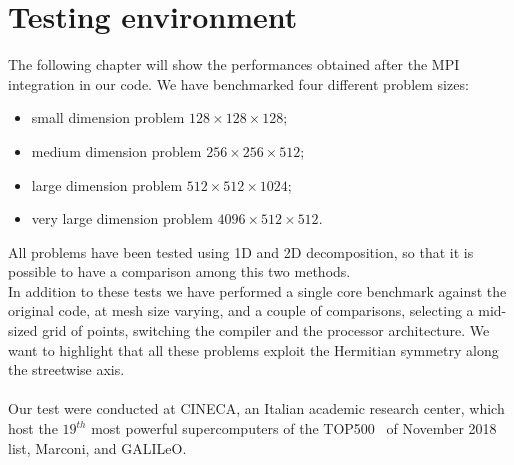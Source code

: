 \section{Testing environment}
The following chapter will show the performances obtained after the MPI integration in our code.
We have benchmarked four different problem sizes:
\begin{itemize}
\item small dimension problem $128\times 128 \times 128$;
\item medium dimension problem $256\times 256\times 512$;
\item large dimension problem $512\times 512\times 1024$;
\item very large dimension problem $4096\times 512\times 512$.  
\end{itemize}
All problems have been tested using 1D and 2D decomposition, so that it is possible to have a comparison among this two methods.
\\
In addition to these tests we have performed a single core benchmark against the original code, at mesh size varying, and a couple of comparisons, selecting a mid-sized grid of points, switching the compiler and the processor architecture.
We want to highlight that all these problems exploit the Hermitian symmetry along the streetwise axis.\\~\\
Our test were conducted at CINECA\cite{Cineca}, an Italian academic research center, which host the $19^{th}$ most powerful supercomputers of the TOP500~\cite{top500} of November 2018 list, Marconi, and GALILeO.

